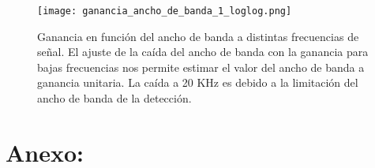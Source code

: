 \documentclass[a4paper, 11pt]{article}
\begin{document}
\begin{figure} [H]
\centering
\texttt{[image: ganancia\_ancho\_de\_banda\_1\_loglog.png]}
\caption{Ganancia en función del ancho de banda a distintas frecuencias de señal. El ajuste de la caída del ancho de banda con la ganancia para bajas frecuencias nos permite estimar el valor del ancho de banda a ganancia unitaria. La caída a 20 KHz es debido a la limitación del ancho de banda de la detección. \label{fig:ganancia_ancho_de_banda_1_loglog}}
\end{figure} 


%
%

\section*{Anexo:}
\end{document}
